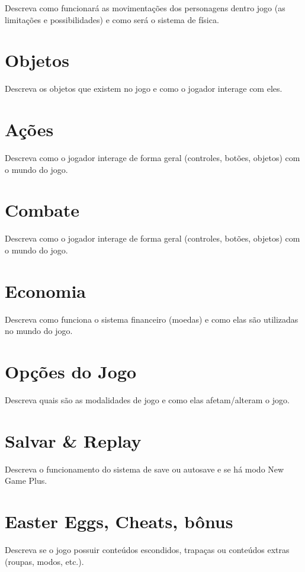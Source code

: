 Descreva como funcionará as movimentações dos personagens dentro jogo (as limitações e possibilidades) e como será o sistema de física.

\section{Objetos}

Descreva os objetos que existem no jogo e como o jogador interage com eles.

\section{Ações}

Descreva como o jogador interage de forma geral (controles, botões, objetos) com o mundo do jogo.

\section{Combate}

Descreva como o jogador interage de forma geral (controles, botões, objetos) com o mundo do jogo.

\section{Economia}

Descreva como funciona o sistema financeiro (moedas) e como elas são utilizadas no mundo do jogo.

\section{Opções do Jogo}

Descreva quais são as modalidades de jogo e como elas afetam/alteram o jogo.

\section{Salvar \& Replay}

Descreva o funcionamento do sistema de save ou autosave e se há modo New Game Plus.

\section{Easter Eggs, Cheats, bônus}

Descreva se o jogo possuir conteúdos escondidos, trapaças ou conteúdos extras (roupas, modos, etc.).